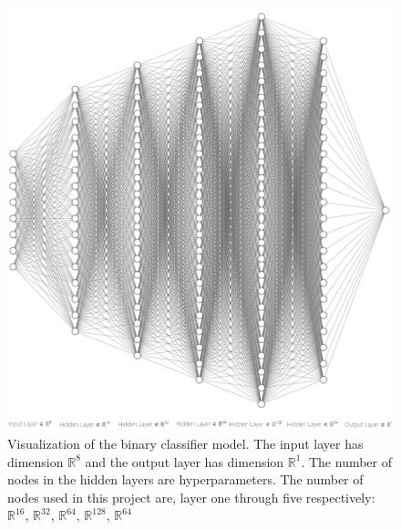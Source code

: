 \documentclass[11pt, fleqn, titlepage]{article}
\begin{document}
	\begin{figure}[H]
		\centering
		\includegraphics[scale=0.8]{imgs/ffnn}
		\caption{Visualization of the binary classifier model. The input layer has dimension $ \mathbb R ^8$ and the output layer has dimension $ \mathbb R^1 $. The number of nodes in the hidden layers are hyperparameters. The number of nodes used in this project are, layer one through five respectively: $ \mathbb R ^{16} $, $ \mathbb R ^{32} $, $ \mathbb R ^{64} $, $ \mathbb R ^{128} $, $ \mathbb R ^{64} $}
		\label{fig:ffnn}
	\end{figure}
		
\end{document}
